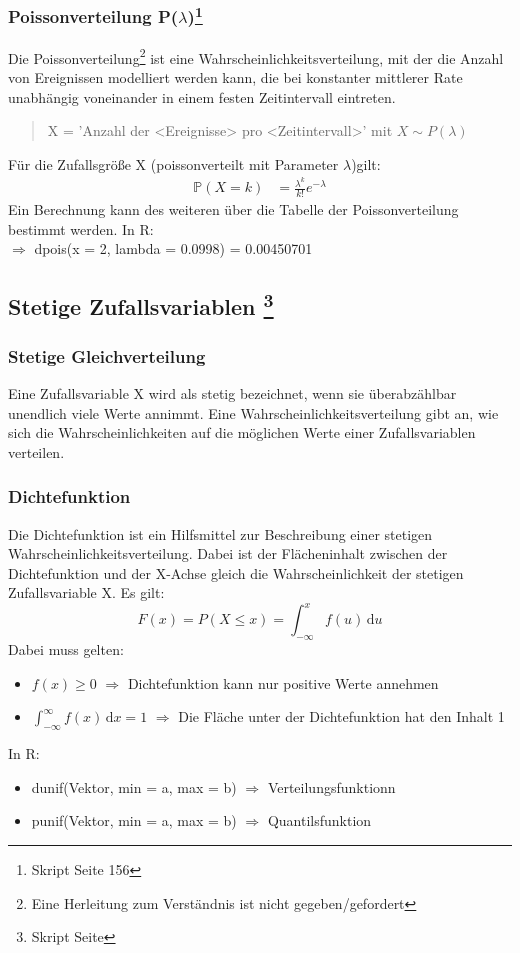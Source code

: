 \documentclass[a4paper,10pt]{scrartcl}
\begin{document}
\subsubsection[Poissonverteilung]{Poissonverteilung P($\lambda$)\footnote{Skript Seite 156}}
Die Poissonverteilung\footnote{Eine Herleitung zum Verständnis ist nicht gegeben/gefordert } ist eine Wahrscheinlichkeitsverteilung, mit der die Anzahl von Ereignissen modelliert werden kann, die bei konstanter mittlerer Rate unabhängig voneinander in einem festen Zeitintervall eintreten.
\begin{quote}
    X = 'Anzahl der <Ereignisse> pro <Zeitintervall>' mit $X \sim P(\lambda)$
\end{quote}
Für die Zufallsgröße X (poissonverteilt mit Parameter $\lambda$)gilt:
\begin{align*}
\mathbb{P}(X=k)&=\frac{\lambda^k}{k!}e^{-\lambda}
\end{align*}
Ein Berechnung kann des weiteren über die Tabelle der Poissonverteilung bestimmt werden.
In R:\\
$\Rightarrow$ dpois(x = 2, lambda = 0.0998) = 0.00450701
\subsection[Stetige Zufallsvariablen]{Stetige Zufallsvariablen \footnote{Skript Seite}}

\subsubsection{Stetige Gleichverteilung}
Eine Zufallsvariable X wird als stetig bezeichnet, wenn sie überabzählbar unendlich viele Werte annimmt.
Eine Wahrscheinlichkeitsverteilung gibt an, wie sich die Wahrscheinlichkeiten auf die möglichen Werte einer Zufallsvariablen verteilen.
\subsubsection{Dichtefunktion}
Die Dichtefunktion ist ein Hilfsmittel zur Beschreibung einer stetigen Wahrscheinlichkeitsverteilung. Dabei ist der Flächeninhalt zwischen der Dichtefunktion und der X-Achse gleich die Wahrscheinlichkeit der stetigen Zufallsvariable X.
Es gilt:
\begin{equation*}
F(x) = P(X \le x) = \int_{-\infty}^{x} \! f(u) \, \mathrm{d}u    
\end{equation*}
Dabei muss gelten:
\begin{itemize}
    \item $f(x) \geq 0$ $\Rightarrow$ Dichtefunktion kann nur positive Werte annehmen 
    \item $\int_{-\infty}^{\infty} \! f(x) \, \mathrm{d}x = 1$ $\Rightarrow$ Die Fläche unter der Dichtefunktion hat den Inhalt 1
\end{itemize}
In R:
\begin{itemize}
    \item dunif(Vektor, min = a, max = b) $\Rightarrow$ Verteilungsfunktionn
    \item punif(Vektor, min = a, max = b) $\Rightarrow$ Quantilsfunktion
\end{itemize}
\end{document}

